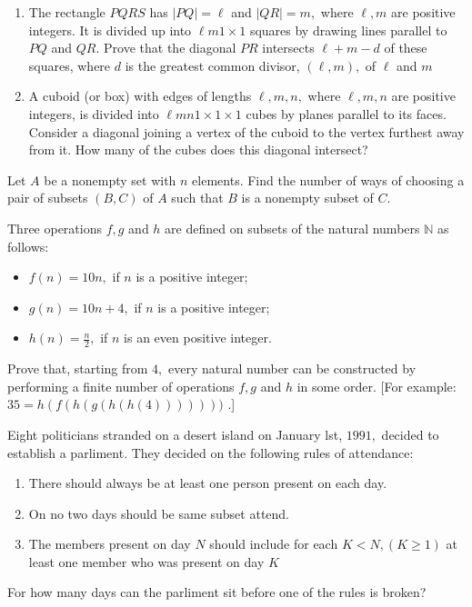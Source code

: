 \documentclass{pset}
\begin{document}
\begin{problems}
\begin{problem}[IrMO 1993 Q10]
    \begin{enumerate}
    \item The rectangle \(P Q R S\) has \(|P Q|=\ell\) and \(|Q R|=m,\) where \(\ell, m\) are positive integers. It is divided up into \(\ell m 1 \times 1\) squares by drawing lines parallel to \(P Q\) and \(Q R .\) Prove that the diagonal \(P R\) intersects \(\ell+m-d\) of these squares, where \(d\) is the greatest common divisor, \((\ell, m),\) of \(\ell\) and \(m\)
    \item A cuboid (or box) with edges of lengths \(\ell, m, n,\) where \(\ell, m, n\) are positive integers, is divided into \(\ell m n 1 \times 1 \times 1\) cubes by planes parallel to its faces. Consider a diagonal joining a vertex of the cuboid to the vertex furthest away from it. How many of the cubes does this diagonal intersect?
\end{enumerate}
\end{problem}

\begin{problem}[IrMO 1992 Q3]
    Let \(A\) be a nonempty set with \(n\) elements. Find the number of ways of choosing a pair of subsets \((B, C)\) of \(A\) such that \(B\) is a nonempty subset of \(C\).
\end{problem}

\begin{problem}[IrMO 1993 Q3]
    Three operations \(f, g\) and \(h\) are defined on subsets of the natural numbers \(\mathbb{N}\) as follows:
    \begin{itemize}
        \item \(f(n)=10 n,\) if \(n\) is a positive integer; 
        \item \(g(n)=10 n+4,\) if \(n\) is a positive integer; 
        \item \(h(n)=\frac{n}{2},\) if \(n\) is an even positive integer.
    \end{itemize}
     Prove that, starting from \(4,\) every natural number can be constructed by performing a finite number of operations \(f, g\) and \(h\) in some order. [For example: $35=h(f(h(g(h(h(4)))))))$ .]
\end{problem}


\begin{problem}[IrMO 1991 Q4]
    Eight politicians stranded on a desert island on January lst, \(1991,\) decided to establish a parliment. They decided on the following rules of attendance:
    \begin{enumerate}
        \item There should always be at least one person present on each day.
        \item On no two days should be same subset attend.
        \item The members present on day \(N\) should include for each \(K<N,(K \geq 1)\) at least one member who was present on day \(K\)
    \end{enumerate}
    For how many days can the parliment sit before one of the rules is broken?
\end{problem}


\end{problems}
\end{document}
